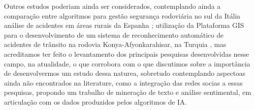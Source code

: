 Outros estudos poderiam ainda ser considerados, contemplando ainda a comparação entre algoritmos para gestão segurança rodoviária no sul da Itália \cite{de2015comparison} análise de acidentes em áreas rurais da Espanha \cite{de2011analysis};  utilização da Plataforma GIS para o desenvolvimento de um sistema de reconhecimento automático de acidentes de trânsito na rodovia Konya-Afyonkarahisar, na Turquia \cite{durduran2010decision}, mas acreditamos ter feito o levantamento dos principais pesquisas desenvolvidas nesse campo, na atualidade, o que corrobora com o que discutimos sobre a importância de desenvolvermos um estudo dessa naturea, sobretudo contemplando aspectoas ainda não encontrados na literature, como a integração das redes socias a essas pesquisas, propondo um trabalho de mineração de texto e análise sentimental, em articulação com os dados produzidos pelos algoritmos de IA.

